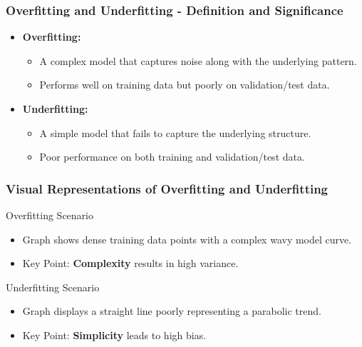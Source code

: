 \documentclass[aspectratio=169]{beamer}
\begin{document}
\begin{frame}[fragile]
    \frametitle{Overfitting and Underfitting - Definition and Significance}
    
    \begin{itemize}
        \item \textbf{Overfitting:} 
        \begin{itemize}
            \item A complex model that captures noise along with the underlying pattern.
            \item Performs well on training data but poorly on validation/test data.
        \end{itemize}
        \item \textbf{Underfitting:}
        \begin{itemize}
            \item A simple model that fails to capture the underlying structure.
            \item Poor performance on both training and validation/test data.
        \end{itemize}
    \end{itemize}
\end{frame}

\begin{frame}[fragile]
    \frametitle{Visual Representations of Overfitting and Underfitting}
    
    \begin{block}{Overfitting Scenario}
        \begin{itemize}
            \item Graph shows dense training data points with a complex wavy model curve.
            \item Key Point: \textbf{Complexity} results in high variance.
        \end{itemize}
    \end{block}
    
    \begin{block}{Underfitting Scenario}
        \begin{itemize}
            \item Graph displays a straight line poorly representing a parabolic trend.
            \item Key Point: \textbf{Simplicity} leads to high bias.
        \end{itemize}
    \end{block}
\end{frame}
\end{document}
